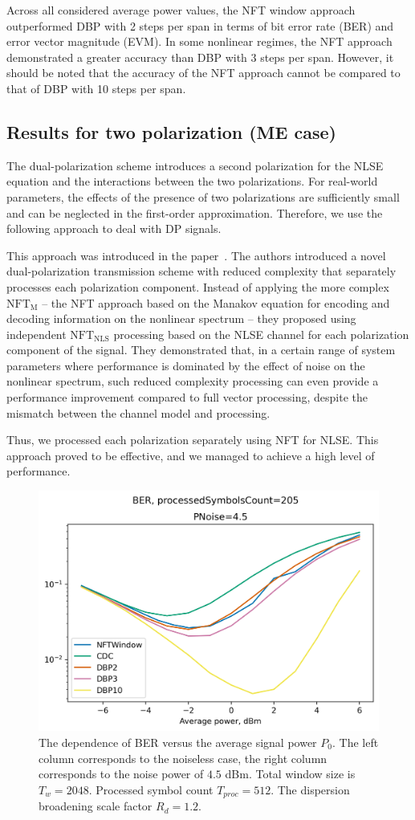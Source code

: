 Across all considered average power values, the NFT window approach outperformed DBP with 2 steps per span in terms of bit error rate (BER) and error vector magnitude (EVM). In some nonlinear regimes, the NFT approach demonstrated a greater accuracy than DBP with 3 steps per span. However, it should be noted that the accuracy of the NFT approach cannot be compared to that of DBP with 10 steps per span.


\subsection{Results for two polarization (ME case)}

The dual-polarization scheme introduces a second polarization for the NLSE equation and the interactions between the two polarizations. For real-world parameters, the effects of the presence of two polarizations are sufficiently small and can be neglected in the first-order approximation. Therefore, we use the following approach to deal with DP signals.

This approach was introduced in the paper~\cite{Civelli2019}. The authors introduced a novel dual-polarization transmission scheme with reduced complexity that separately processes each polarization component. Instead of applying the more complex $\text{NFT}_\text{M}$ -- the NFT approach based on the Manakov equation for encoding and decoding information on the nonlinear spectrum -- they proposed using independent $\text{NFT}_\text{NLS}$ processing based on the NLSE channel for each polarization component of the signal. They demonstrated that, in a certain range of system parameters where performance is dominated by the effect of noise on the nonlinear spectrum, such reduced complexity processing can even provide a performance improvement compared to full vector processing, despite the mismatch between the channel model and processing.

Thus, we processed each polarization separately using NFT for NLSE. This approach proved to be effective, and we managed to achieve a high level of performance.

\begin{figure}[!hbt]
    \centering
    \includegraphics[width=0.6\linewidth]{images/window/BER_processedSymbolsCount=205.png}
    \caption{The dependence of BER versus the average signal power $P_0$. The left column corresponds to the noiseless case, the right column corresponds to the noise power of $4.5$ dBm. Total window size is $T_w=2048$. Processed symbol count $T_{proc} = 512$. The dispersion broadening scale factor $R_d=1.2$.}
    \label{fig:noise_ME}
\end{figure}


